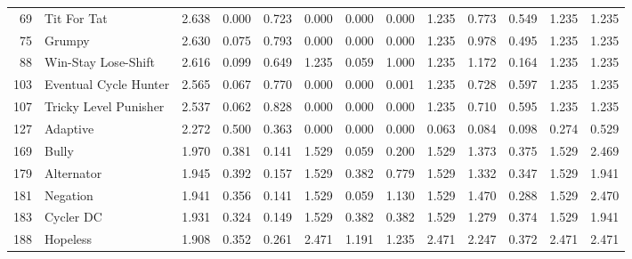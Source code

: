 \begin{tabular}{rlrrrrrrrrrrr}
   69 &            Tit For Tat &           2.638 &       0.000 &    0.723 &             0.000 &         0.000 &           0.000 &            1.235 &          0.773 &         0.549 &            1.235 &         1.235 \\
   75 &                 Grumpy &           2.630 &       0.075 &    0.793 &             0.000 &         0.000 &           0.000 &            1.235 &          0.978 &         0.495 &            1.235 &         1.235 \\
   88 &    Win-Stay Lose-Shift &           2.616 &       0.099 &    0.649 &             1.235 &         0.059 &           1.000 &            1.235 &          1.172 &         0.164 &            1.235 &         1.235 \\
  103 &  Eventual Cycle Hunter &           2.565 &       0.067 &    0.770 &             0.000 &         0.000 &           0.001 &            1.235 &          0.728 &         0.597 &            1.235 &         1.235 \\
  107 &  Tricky Level Punisher &           2.537 &       0.062 &    0.828 &             0.000 &         0.000 &           0.000 &            1.235 &          0.710 &         0.595 &            1.235 &         1.235 \\
  127 &               Adaptive &           2.272 &       0.500 &    0.363 &             0.000 &         0.000 &           0.000 &            0.063 &          0.084 &         0.098 &            0.274 &         0.529 \\
  169 &                  Bully &           1.970 &       0.381 &    0.141 &             1.529 &         0.059 &           0.200 &            1.529 &          1.373 &         0.375 &            1.529 &         2.469 \\
  179 &             Alternator &           1.945 &       0.392 &    0.157 &             1.529 &         0.382 &           0.779 &            1.529 &          1.332 &         0.347 &            1.529 &         1.941 \\
  181 &               Negation &           1.941 &       0.356 &    0.141 &             1.529 &         0.059 &           1.130 &            1.529 &          1.470 &         0.288 &            1.529 &         2.470 \\
  183 &              Cycler DC &           1.931 &       0.324 &    0.149 &             1.529 &         0.382 &           0.382 &            1.529 &          1.279 &         0.374 &            1.529 &         1.941 \\
  188 &               Hopeless &           1.908 &       0.352 &    0.261 &             2.471 &         1.191 &           1.235 &            2.471 &          2.247 &         0.372 &            2.471 &         2.471 \\

\end{tabular}
